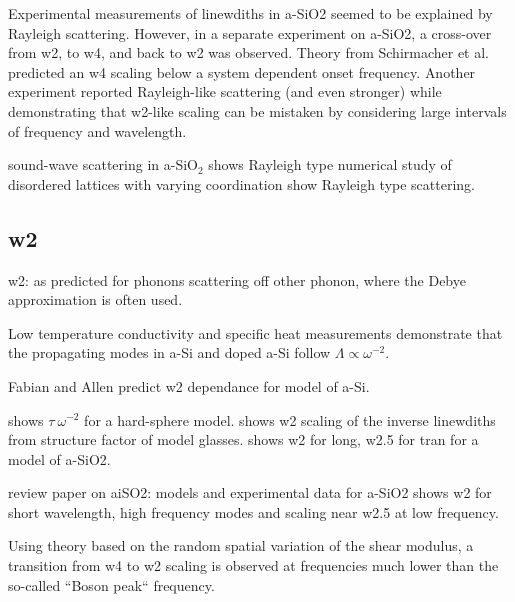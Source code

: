 \documentclass[aps,prb,twocolumn,superscriptaddress,footinbib,amsmath,amssymb,floatfix]{revtex4}
\begin{document}
Experimental measurements of linewdiths in a-SiO2 
seemed to be explained by Rayleigh scattering.
\cite{wischnewski_sound-wave_1998}
However, in a separate experiment on a-SiO2, 
a cross-over from w2, to w4, and back to w2 was observed.
\cite{masciovecchio_evidence_2006} Theory from Schirmacher et al. predicted 
an w4 scaling below a system dependent onset frequency.
\cite{schirmacher_thermal_2006,schirmacher_acoustic_2007}
Another experiment reported Rayleigh-like scattering (and even 
stronger) while demonstrating that w2-like scaling 
can be mistaken by considering large intervals of 
frequency and wavelength.\cite{ruffle_observation_2003}

sound-wave scattering in a-SiO$_2$ shows Rayleigh type 
\cite{wischnewski_sound-wave_1998}
numerical study of disordered lattices with varying coordination 
show Rayleigh type scattering.\cite{wyart_scaling_2010} 

\subsection{\label{S:Theory:Thermal}w2}

w2: as predicted for phonons scattering off other phonon, where 
the Debye approximation is often used. 

Low temperature conductivity and specific heat measurements demonstrate 
that the propagating modes in a-Si and doped a-Si follow 
$\Lambda \propto \omega^{-2}$.
\cite{zink_thermal_2006,zink_excess_2006} 

Fabian and Allen predict w2 dependance for model of a-Si.
\cite{fabian_theory_1999}

shows $\tau ~ \omega^{-2}$ for a hard-sphere model.
\cite{gotze_evolution_2000} 
shows w2 scaling of the inverse linewdiths from structure factor of model 
glasses.\cite{shintani_universal_2008}
shows w2 for long, w2.5 for tran for a model of a-SiO2.
\cite{horbach_high_2001}

review paper on aiSO2: models and experimental data for a-SiO2 shows w2 for 
short wavelength, high frequency modes and scaling near w2.5 at low frequency.
\cite{ruocco_high-frequency_2001} 

Using theory based on the random spatial variation of the shear modulus, 
a transition from w4 to w2 scaling is observed at frequencies much lower
than the so-called ``Boson peak`` frequency.
\cite{schirmacher_acoustic_2007}
\end{document}
